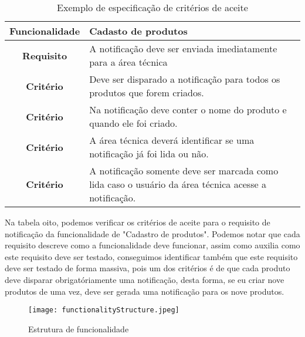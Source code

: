       \begin{table}[h!]
        \centering
        \begin{tabular}{|c|p{10cm}|}
          \hline
          \textbf{Funcionalidade} &
          Cadasto de produtos \\ \hline
          \textbf{Requisito} &
          A notificação deve ser enviada imediatamente para a área técnica \\ \hline
          \textbf{Critério} &
          Deve ser disparado a notificação para todos os produtos que forem criados. \\ \hline
          \textbf{Critério} &
          Na notificação deve conter o nome do produto e quando ele foi criado. \\ \hline
          \textbf{Critério} &
          A área técnica deverá identificar se uma notificação já foi lida ou não. \\ \hline
          \textbf{Critério} &
          A notificação somente deve ser marcada como lida caso o usuário da área
          técnica acesse a notificação. \\ \hline
        \end{tabular}
        \caption{Exemplo de especificação de critérios de aceite}
        \label{Tabela:8}
      \end{table}

      Na tabela oito, podemos verificar os critérios de aceite para o requisito de
      notificação da funcionalidade de "Cadastro de produtos". Podemos notar que cada
      requisito descreve como a funcionalidade deve funcionar, assim como auxilia
      como este requisito deve ser testado, conseguimos identificar também que este
      requisito deve ser testado de forma massiva, pois um dos critérios é de que
      cada produto deve disparar obrigatóriamente uma notificação, desta forma, se
      eu criar nove produtos de uma vez, deve ser gerada uma notificação para os
      nove produtos. \newline

      \begin{figure}[!h]
        \centering
        \texttt{[image: functionalityStructure.jpeg]}
        \caption{Estrutura de funcionalidade}
        \label{Imagem:1}
      \end{figure}

